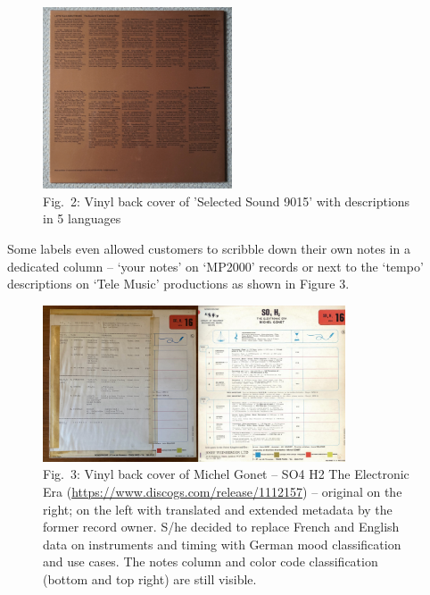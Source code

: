 \documentclass[a4paper,
fontsize=11pt,
oneside,
numbers=noperiodatend,
parskip=half-,
bibliography=totoc,
final
]{scrartcl}
\begin{document}
\begin{figure}
\centering
\includegraphics[width=0.5\textwidth]{img/Fig2.jpg}
\caption{Fig.~2: Vinyl back cover of 'Selected Sound 9015' with descriptions in 5 languages}
\end{figure}

Some labels even allowed customers to scribble down their own notes in a
dedicated column -- \enquote*{your notes} on \enquote*{MP2000} records
or next to the \enquote*{tempo} descriptions on \enquote*{Tele Music}
productions as shown in Figure 3.

\begin{figure}
\centering
\includegraphics[width=0.8\textwidth]{img/Fig3.jpg}
\caption{Fig.~3: Vinyl back cover of Michel Gonet – SO4 H2 The Electronic Era (\url{https://www.discogs.com/release/1112157}) – original on the right; on the left with translated and extended metadata by the former record owner. S/he decided to replace French and English data on instruments and timing with German mood classification and use cases. The notes column and color code classification (bottom and top right) are still visible.}
\end{figure}
\end{document}
